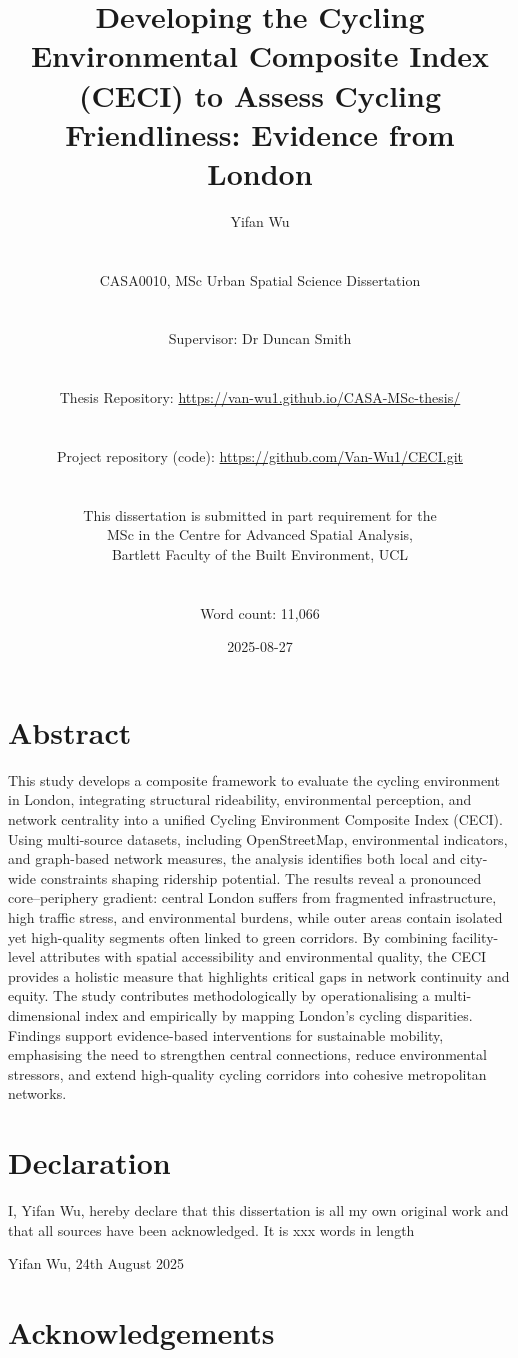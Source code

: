 \documentclass[
  12pt,
  oneside]{book}
\title{Developing the Cycling Environmental Composite Index (CECI) to Assess Cycling Friendliness: Evidence from London}
\author{Yifan Wu\\
\strut \\
CASA0010, MSc Urban Spatial Science Dissertation\\
\strut \\
Supervisor: Dr Duncan Smith\\
\strut \\
Thesis Repository: \url{https://van-wu1.github.io/CASA-MSc-thesis/}\\
\strut \\
Project repository (code): \url{https://github.com/Van-Wu1/CECI.git}\\
\strut \\
This dissertation is submitted in part requirement for the\\
MSc in the Centre for Advanced Spatial Analysis,\\
Bartlett Faculty of the Built Environment, UCL\\
\strut \\
Word count: 11,066}
\date{2025-08-27}
\begin{document}
\maketitle


\chapter*{Abstract}\label{abstract}

This study develops a composite framework to evaluate the cycling environment in London, integrating structural rideability, environmental perception, and network centrality into a unified Cycling Environment Composite Index (CECI). Using multi-source datasets, including OpenStreetMap, environmental indicators, and graph-based network measures, the analysis identifies both local and city-wide constraints shaping ridership potential. The results reveal a pronounced core--periphery gradient: central London suffers from fragmented infrastructure, high traffic stress, and environmental burdens, while outer areas contain isolated yet high-quality segments often linked to green corridors. By combining facility-level attributes with spatial accessibility and environmental quality, the CECI provides a holistic measure that highlights critical gaps in network continuity and equity. The study contributes methodologically by operationalising a multi-dimensional index and empirically by mapping London's cycling disparities. Findings support evidence-based interventions for sustainable mobility, emphasising the need to strengthen central connections, reduce environmental stressors, and extend high-quality cycling corridors into cohesive metropolitan networks.


\chapter*{Declaration}\label{declaration}

I, Yifan Wu, hereby declare that this dissertation is all my own original work and that all sources have been acknowledged. It is xxx words in length

Yifan Wu, 24th August 2025

\chapter*{Acknowledgements}\label{acknowledgements}
\end{document}
